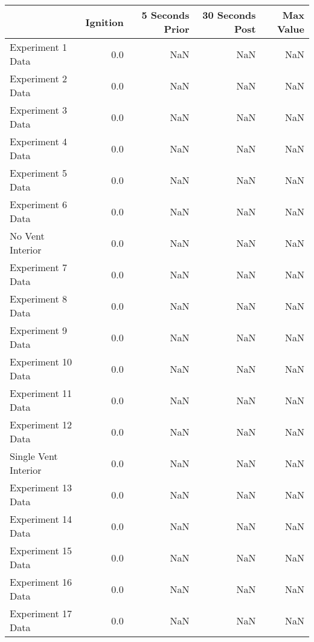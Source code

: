 \begin{tabular}{lrrrr}
\toprule
{} &  Ignition &  5 Seconds Prior &  30 Seconds Post &  Max Value \\
\midrule
Experiment 1 Data    &       0.0 &              NaN &              NaN &        NaN \\
Experiment 2 Data    &       0.0 &              NaN &              NaN &        NaN \\
Experiment 3 Data    &       0.0 &              NaN &              NaN &        NaN \\
Experiment 4 Data    &       0.0 &              NaN &              NaN &        NaN \\
Experiment 5 Data    &       0.0 &              NaN &              NaN &        NaN \\
Experiment 6 Data    &       0.0 &              NaN &              NaN &        NaN \\
No Vent Interior     &       0.0 &              NaN &              NaN &        NaN \\
Experiment 7 Data    &       0.0 &              NaN &              NaN &        NaN \\
Experiment 8 Data    &       0.0 &              NaN &              NaN &        NaN \\
Experiment 9 Data    &       0.0 &              NaN &              NaN &        NaN \\
Experiment 10 Data   &       0.0 &              NaN &              NaN &        NaN \\
Experiment 11 Data   &       0.0 &              NaN &              NaN &        NaN \\
Experiment 12 Data   &       0.0 &              NaN &              NaN &        NaN \\
Single Vent Interior &       0.0 &              NaN &              NaN &        NaN \\
Experiment 13 Data   &       0.0 &              NaN &              NaN &        NaN \\
Experiment 14 Data   &       0.0 &              NaN &              NaN &        NaN \\
Experiment 15 Data   &       0.0 &              NaN &              NaN &        NaN \\
Experiment 16 Data   &       0.0 &              NaN &              NaN &        NaN \\
Experiment 17 Data   &       0.0 &              NaN &              NaN &        NaN \\

\end{tabular}

